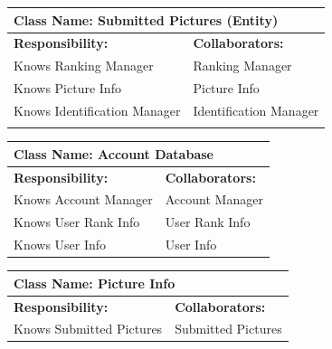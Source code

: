 \documentclass[]{article}
\begin{document}
	\begin{table}[H]
		\centering
		\begin{tabular}{|p{8cm}|p{8cm}|}
		\hline 
		 \multicolumn{2}{|l|}{\textbf{Class Name:} Submitted Pictures (Entity)} \\
		\hline
		\textbf{Responsibility:} & \textbf{Collaborators:} \\
		\hline
		Knows Ranking Manager & Ranking Manager \\
		Knows Picture Info & Picture Info \\
		Knows Identification Manager & Identification Manager \\
		\vspace{1in} & \\
		\hline
		\end{tabular}
	\end{table}


	\begin{table}[H]
		\centering
		\begin{tabular}{|p{8cm}|p{8cm}|}
		\hline 
		 \multicolumn{2}{|l|}{\textbf{Class Name:} Account Database} \\
		\hline
		\textbf{Responsibility:} & \textbf{Collaborators:} \\
		\hline 
            Knows Account Manager & Account Manager\\ 
            Knows User Rank Info & User Rank Info \\
            Knows User Info & User Info       
		\vspace{1in} \\
		\hline
		\end{tabular}
	\end{table}

	\begin{table}[H]
		\centering
		\begin{tabular}{|p{8cm}|p{8cm}|}
		\hline 
		 \multicolumn{2}{|l|}{\textbf{Class Name:} Picture Info} \\
		\hline
		\textbf{Responsibility:} & \textbf{Collaborators:} \\
		\hline
            Knows Submitted Pictures & Submitted Pictures 
		\vspace{1in} \\
		\hline
		\end{tabular}
	\end{table}
\end{document}
